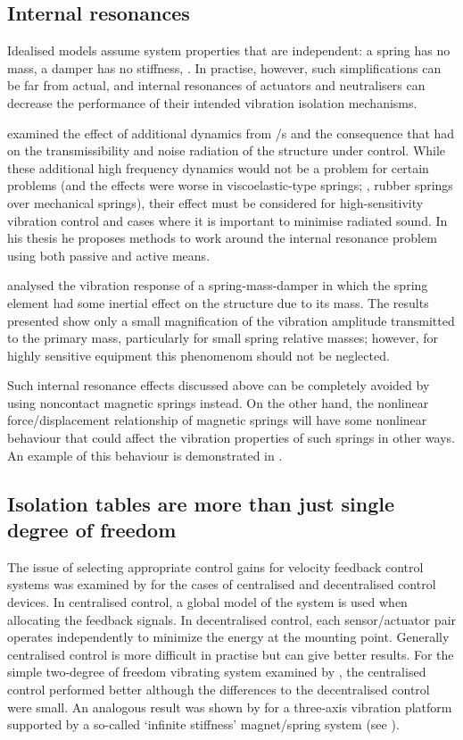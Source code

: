   

\subsection{Internal resonances}

Idealised models assume system properties that are independent: a spring has no mass, a damper has no stiffness, \etc.
In practise, however, such simplifications can be far from actual, and internal resonances of actuators and neutralisers can decrease the performance of their intended vibration isolation mechanisms.

\textcite{du2003thesis} examined the effect of additional dynamics from \vibneut/s and the consequence that had on the transmissibility and noise radiation of the structure under control.
While these additional high frequency dynamics would not be a problem for certain problems (and the effects were worse in viscoelastic-type springs; \ie, rubber springs over mechanical springs), their effect must be considered for high-sensitivity vibration control and cases where it is important to minimise radiated sound.
In his thesis he proposes methods to work around the internal resonance problem using both passive and active means.

\textcite{wu2006} analysed the vibration response of a spring-mass-damper in which the spring element had some inertial effect on the structure due to its mass.
The results presented show only a small magnification of the vibration amplitude transmitted to the primary mass, particularly for small spring relative masses; however, for highly sensitive equipment this phenomenom should not be neglected.

Such internal resonance effects discussed above can be completely avoided by using noncontact magnetic springs instead.
On the other hand, the nonlinear force/displacement relationship of magnetic springs will have some nonlinear behaviour that could affect the vibration properties of such springs in other ways.
An example of this behaviour is demonstrated in .


\subsection{Isolation tables are more than just single degree of freedom}

The issue of selecting appropriate control gains for velocity feedback control systems was examined by \textcite{engels2008} for the cases of centralised and decentralised control devices.
In centralised control, a global model of the system is used when allocating the feedback signals.
In decentralised control, each sensor/actuator pair operates independently to minimize the energy at the mounting point.
Generally centralised control is more difficult in practise but can give better results.
For the simple two-degree of freedom vibrating system examined by \textcite{engels2008}, the centralised control performed better although the differences to the decentralised control were small.
An analogous result was shown by \textcite{hoque2006} for a three-axis vibration platform supported by a so-called `infinite stiffness' magnet/spring system (see ).

